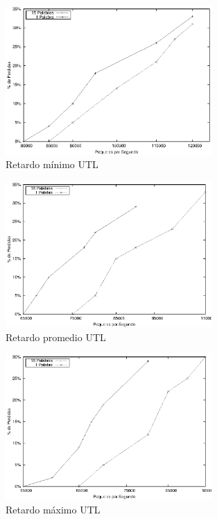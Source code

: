 \begin{figure}[!h]
  \centering
	\includegraphics[width=0.7\textwidth]{5-resultados/graf/utlmin.eps}
  \caption{Retardo mínimo UTL}
  \label{fig}
\end{figure}
\begin{figure}[!h]
  \centering
	\includegraphics[width=0.7\textwidth]{5-resultados/graf/utlprom.eps}
  \caption{Retardo promedio UTL}
  \label{fig}
\end{figure}
\begin{figure}[!h]
  \centering
	\includegraphics[width=0.7\textwidth]{5-resultados/graf/utlmax.eps}
  \caption{Retardo máximo UTL}
  \label{fig}
\end{figure}


